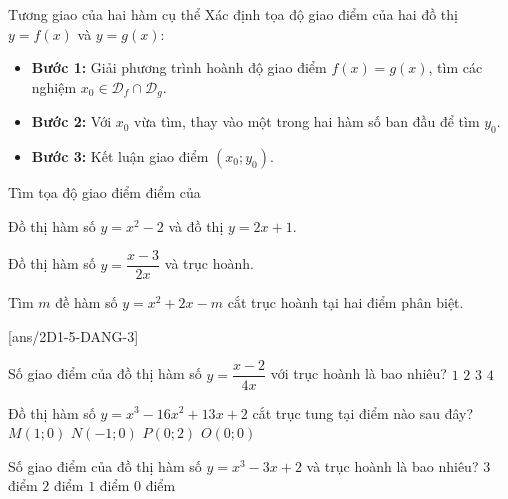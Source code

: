 \begin{dang}{Tương giao của hai hàm cụ thể}
    Xác định tọa độ giao điểm của hai đồ thị $y=f(x)$ và $y=g(x)$:
\begin{itemize}
    \item \textbf{Bước 1: } Giải phương trình hoành độ giao điểm $f(x)=g(x)$, tìm các nghiệm $x_0 \in \mathscr{D}_f \cap \mathscr{D}_g$.
    \item \textbf{Bước 2: } Với $x_0$ vừa tìm, thay vào một trong hai hàm số ban đầu để tìm $y_0$.
    \item \textbf{Bước 3: } Kết luận giao điểm $(x_0;y_0)$.
\end{itemize}
\end{dang}
\begin{vd}
Tìm tọa độ giao điểm điểm của
\begin{listEX}[2]
    \item Đồ thị hàm số $y=x^2-2$ và đồ thị $y=2x+1$.
    \item Đồ thị hàm số $y=\dfrac{x-3}{2x}$ và trục hoành.
\end{listEX}
\loigiai{}
\end{vd}
\begin{vd}
Tìm $m$ đề hàm số $y=x^2+2x-m$ cắt trục hoành tại hai điểm phân biệt.
\loigiai{}
\end{vd}
\BTTN
{}[ans/2D1-5-DANG-3]
\begin{ex}%
Số giao điểm của đồ thị hàm số $y=\dfrac{x-2}{4x}$ với trục hoành là bao nhiêu?
\choice
{\True $1$}
{$2$}
{$3$}
{$4$}
\end{ex}
\begin{ex}%
Đồ thị hàm số $y=x^3-16x^2+13x+2$ cắt trục tung tại điểm nào sau đây?
\choice
{$M(1;0)$}
{$N(-1;0)$}
{\True $P(0;2)$}
{$O(0;0)$}
\end{ex}
\begin{ex}%
Số giao điểm của đồ thị hàm số $y=x^3-3x+2$ và trục hoành là bao nhiêu?
\choice
{$3$ điểm}
{\True $2$ điểm}
{$1$ điểm}
{$0$ điểm}
\end{ex}
